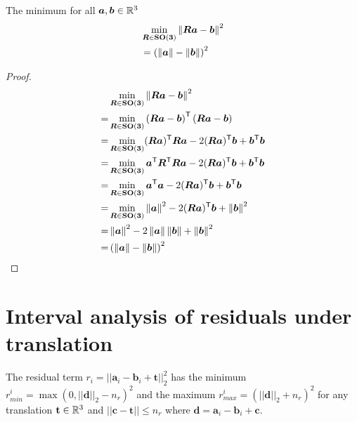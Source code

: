 \clearpage
\setcounter{page}{1}
\maketitlesupplementary



\begin{lemma}\label{lemma:ls-rot}
	The minimum for all $\boldsymbol{a}, \boldsymbol{b} \in \mathbb{R}^3$
	\begin{equation}
		\begin{aligned}
			&\min_{{\bm R} \in \mathbf{SO(3)}} \left\|{\bm R} \boldsymbol{a} - \boldsymbol{b}\right\|^2\\
			&= \left( \left\| \boldsymbol{a} \right\| - \left\| \boldsymbol{b} \right\| \right)^2
		\end{aligned}
	\end{equation}
\end{lemma}

\begin{proof}
\begin{equation}
	\begin{aligned}
		&\min_{{\bm R} \in \mathbf{SO(3)}} \left\|{\bm R} \boldsymbol{a} - \boldsymbol{b}\right\|^2\\
		=&\min_{{\bm R} \in \mathbf{SO(3)}} \left( {\bm R} \boldsymbol{a} - \boldsymbol{b} \right)^{\mathsf{T}} \left( {\bm R} \boldsymbol{a} - \boldsymbol{b} \right)\\
		=&\min_{{\bm R} \in \mathbf{SO(3)}} ({\bm R}\boldsymbol{a})^{\mathsf{T}} {\bm R}\boldsymbol{a} - 2 ({\bm R} \boldsymbol{a})^{\mathsf{T}} \boldsymbol{b} + \boldsymbol{b}^{\mathsf{T}} \boldsymbol{b}\\
		=&\min_{{\bm R} \in \mathbf{SO(3)}} \boldsymbol{a}^{\mathsf{T}} {\bm R}^{\mathsf{T}} {\bm R} \boldsymbol{a} - 2 ({\bm R} \boldsymbol{a})^{\mathsf{T}} \boldsymbol{b} + \boldsymbol{b}^{\mathsf{T}} \boldsymbol{b}\\
		=&\min_{{\bm R} \in \mathbf{SO(3)}} \boldsymbol{a}^{\mathsf{T}} \boldsymbol{a} - 2 ({\bm R} \boldsymbol{a})^{\mathsf{T}} \boldsymbol{b} + \boldsymbol{b}^{\mathsf{T}} \boldsymbol{b}\\
		=&\min_{{\bm R} \in \mathbf{SO(3)}} \left\|\boldsymbol{a}\right\|^2 - 2 ({\bm R} \boldsymbol{a})^{\mathsf{T}} \boldsymbol{b}  + \left\|\boldsymbol{b}\right\|^2\\
		=& \left\|\boldsymbol{a}\right\|^2 - 2 \left\| \boldsymbol{a} \right\| \left\| \boldsymbol{b} \right\|  + \left\|\boldsymbol{b}\right\|^2\\
		=& \left( \left\| \boldsymbol{a} \right\| - \left\| \boldsymbol{b} \right\| \right)^2
	\end{aligned}
\end{equation}
	
\end{proof}



\section{Interval analysis of residuals under translation}
\label{proof:tls-relax-minmax-r}

\begin{theorem}
	The residual term $r_i = ||\mathbf{a}_i - \mathbf{b}_i + \mathbf{t}||_2^2$
	has the minimum $r_{min}^i = \max(0, ||\mathbf{d}||_2 - n_r)^2$ and the maximum $r_{max}^i = (||\mathbf{d}||_2 + n_r)^2$
	for any translation $\mathbf{t} \in \mathbb{R}^3$ and $||\mathbf{c} - \mathbf{t}|| \leq n_r$ where $\mathbf{d} = \mathbf{a}_i - \mathbf{b}_i + \mathbf{c}$.
\end{theorem}

